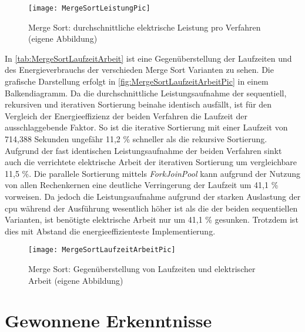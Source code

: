 \begin{figure}[H]
	\begin{center}	 
	\texttt{[image: MergeSortLeistungPic]}
	\caption{Merge Sort: durchschnittliche elektrische Leistung pro Verfahren (eigene Abbildung)}
	\label{fig:MergeSortLeistungPic}
	\end{center}
\end{figure}
In \autoref{tab:MergeSortLaufzeitArbeit} ist eine Gegenüberstellung der Laufzeiten und des Energieverbrauchs der verschieden Merge Sort Varianten zu sehen. Die grafische Darstellung erfolgt in \autoref{fig:MergeSortLaufzeitArbeitPic} in einem Balkendiagramm. Da die durchschnittliche Leistungsaufnahme der sequentiell, rekursiven und iterativen Sortierung beinahe identisch ausfällt, ist für den Vergleich der Energieeffizienz der beiden Verfahren die Laufzeit der ausschlaggebende Faktor. So ist die iterative Sortierung mit einer Laufzeit von 714,388 Sekunden ungefähr 11,2 \% schneller als die rekursive  Sortierung. Aufgrund der fast identischen Leistungsaufnahme der beiden Verfahren sinkt auch die verrichtete elektrische Arbeit der iterativen Sortierung um vergleichbare 11,5 \%. Die parallele Sortierung mittels \emph{ForkJoinPool} kann aufgrund der Nutzung von allen Rechenkernen eine deutliche Verringerung der Laufzeit um 41,1 \% vorweisen. Da jedoch die Leistungsaufnahme aufgrund der starken Auslastung der \ac{cpu} während der Ausführung wesentlich höher ist als die der beiden sequentiellen Varianten, ist benötigte elektrische Arbeit nur um 41,1 \% gesunken. Trotzdem ist dies mit Abstand die energieeffizienteste Implementierung.


\begin{figure}[H]
	\begin{center}	 
	\texttt{[image: MergeSortLaufzeitArbeitPic]}
	\caption{Merge Sort: Gegenüberstellung von Laufzeiten und elektrischer Arbeit (eigene Abbildung)}
	\label{fig:MergeSortLaufzeitArbeitPic} 
	\end{center}
\end{figure}

\section{Gewonnene Erkenntnisse}

